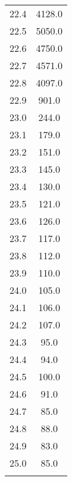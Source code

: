 \begin{table}
\begin{tabular}{S[table-format=1.1] S[table-format=4.1]}
    22.4&	4128.0\\
    22.5&	5050.0\\
    22.6&	4750.0\\
    22.7&	4571.0\\
    22.8&	4097.0\\
    22.9&	901.0\\
    23.0&	244.0\\
    23.1&	179.0\\
    23.2&	151.0\\
    23.3&	145.0\\
    23.4&	130.0\\
    23.5&	121.0\\
    23.6&	126.0\\
    23.7&	117.0\\
    23.8&	112.0\\
    23.9&	110.0\\
    24.0&	105.0\\
    24.1&	106.0\\
    24.2&	107.0\\
    24.3&	95.0\\
    24.4&	94.0\\
    24.5&	100.0\\
    24.6&	91.0\\
    24.7&	85.0\\
    24.8&	88.0\\
    24.9&	83.0\\
    25.0&	85.0\\
    &\\
        \bottomrule
    \end{tabular}
\end{table}

